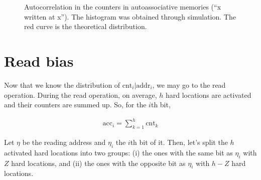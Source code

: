 \begin{figure}[h!]
  \centering

  \caption{Autocorrelation in the counters in autoassociative memories (``x written at x''). The histogram was obtained through simulation. The red curve is the theoretical distribution.}
  \label{fig:sdm-corr-prob}
\end{figure}



\section{Read bias}

Now that we know the distribution of $\text{cnt}_i | \text{addr}_i$, we may go to the read operation. During the read operation, on average, $h$ hard locations are activated and their counters are summed up. So, for the $i$th bit,

\begin{align}
\text{acc}_i = \sum_{k=1}^{h} \text{cnt}_k
\end{align}

Let $\eta$ be the reading address and $\eta_i$ the $i$th bit of it. Then, let's split the $h$ activated hard locations into two groups: (i) the ones with the same bit as $\eta_i$ with $Z$ hard locations, and (ii) the ones with the opposite bit as $\eta_i$ with $h-Z$ hard locations.

